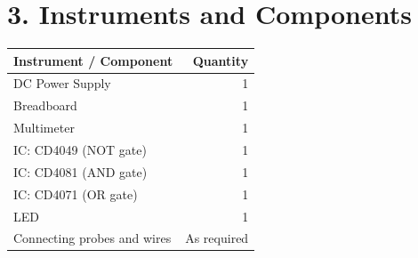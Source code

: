 \section*{3. Instruments and Components}

\begin{table}[H]
\centering
\small
\begin{tabularx}{0.8\textwidth}{X r}
\toprule
\textbf{Instrument / Component} & \textbf{Quantity} \\
\midrule
DC Power Supply & 1 \\
Breadboard & 1 \\
Multimeter & 1 \\
IC: CD4049 (NOT gate) & 1 \\
IC: CD4081 (AND gate) & 1 \\
IC: CD4071 (OR gate) & 1 \\
LED & 1 \\
Connecting probes and wires & As required \\
\bottomrule
\end{tabularx}
\end{table}
